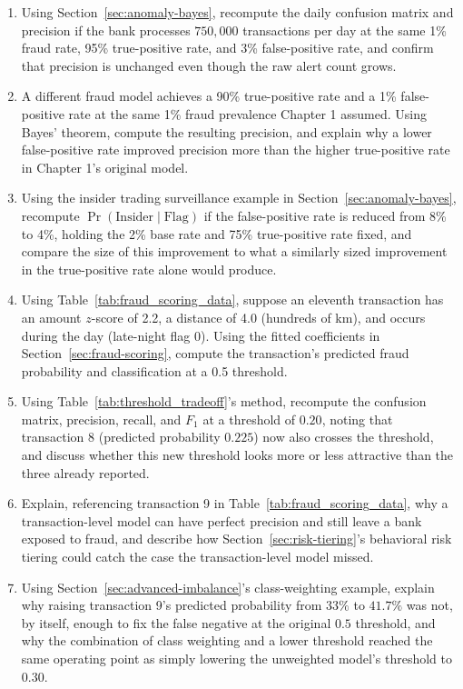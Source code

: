\documentclass[../ai_in_finance]{subfiles}
\begin{document}
\begin{enumerate}
    \item Using Section~\ref{sec:anomaly-bayes}, recompute the daily confusion matrix and precision if the bank processes $750{,}000$ transactions per day at the same 1\% fraud rate, 95\% true-positive rate, and 3\% false-positive rate, and confirm that precision is unchanged even though the raw alert count grows.
    \item A different fraud model achieves a 90\% true-positive rate and a 1\% false-positive rate at the same 1\% fraud prevalence Chapter 1 assumed. Using Bayes' theorem, compute the resulting precision, and explain why a lower false-positive rate improved precision more than the higher true-positive rate in Chapter 1's original model.
    \item Using the insider trading surveillance example in Section~\ref{sec:anomaly-bayes}, recompute $\Pr(\text{Insider}\mid\text{Flag})$ if the false-positive rate is reduced from 8\% to 4\%, holding the 2\% base rate and 75\% true-positive rate fixed, and compare the size of this improvement to what a similarly sized improvement in the true-positive rate alone would produce.
    \item Using Table~\ref{tab:fraud_scoring_data}, suppose an eleventh transaction has an amount $z$-score of 2.2, a distance of 4.0 (hundreds of km), and occurs during the day (late-night flag 0). Using the fitted coefficients in Section~\ref{sec:fraud-scoring}, compute the transaction's predicted fraud probability and classification at a 0.5 threshold.
    \item Using Table~\ref{tab:threshold_tradeoff}'s method, recompute the confusion matrix, precision, recall, and $F_1$ at a threshold of $0.20$, noting that transaction 8 (predicted probability $0.225$) now also crosses the threshold, and discuss whether this new threshold looks more or less attractive than the three already reported.
    \item Explain, referencing transaction 9 in Table~\ref{tab:fraud_scoring_data}, why a transaction-level model can have perfect precision and still leave a bank exposed to fraud, and describe how Section~\ref{sec:risk-tiering}'s behavioral risk tiering could catch the case the transaction-level model missed.
    \item Using Section~\ref{sec:advanced-imbalance}'s class-weighting example, explain why raising transaction 9's predicted probability from $33\%$ to $41.7\%$ was not, by itself, enough to fix the false negative at the original $0.5$ threshold, and why the combination of class weighting and a lower threshold reached the same operating point as simply lowering the unweighted model's threshold to $0.30$.

\end{enumerate}
\end{document}
